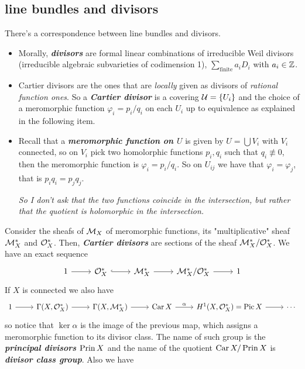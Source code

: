 \subsection{line bundles and divisors}
There's a correspondence between line bundles and divisors.
\begin{defn}\leavevmode
	\begin{itemize}
		\item Morally, \textbf{\textit{divisors}} are formal linear combinations of irreducible Weil divisors (irreducible algebraic subvarieties of codimension 1), $\sum_{\text{finite}}a_iD_i$ with $a_i\in\mathbb{Z}$.
		\item Cartier divisors are the ones that are \textit{locally} given as divisors of \textit{rational function ones}. So a \textbf{\textit{Cartier divisor}} is a covering $\mathcal{U}=\{U_i\}$ and the choice of a meromorphic function $\varphi_i=p_i/q_i$ on each $U_i$ up to equivalence as explained in the following item.
		\item Recall that a \textbf{\textit{meromorphic function on $U$}} is given by $U=\bigcup V_i$ with $V_i$ connected, so on $V_i$ pick two homolorphic functions $p_i,q_i$ such that $q_i\not\equiv0$, then the meromorphic function is $\varphi_i=p_i/q_i$. So on $U_{ij}$ we have that $\varphi_i=\varphi_j$, that is $p_iq_i=p_jq_j$.
	
		\textit{So I don't ask that the two functions coincide in the intersection, but rather that the quotient is holomorphic in the intersection.}
		
	\end{itemize}
\end{defn}
Consider the sheafs of $\mathcal{M}_X$ of meromorphic functions, its "multiplicative" sheaf $\mathcal{M}^*_X$ and $\mathcal{O}^*_X$. Then, \textbf{\textit{Cartier divisors}} are sections of the sheaf $\mathcal{M}_X^*/\mathcal{O}_X^*$. We have an exact sequence
\[\begin{tikzcd}
	1\arrow[r]&\Oc_X^*\arrow[r,hook]&\Mc_X^*\arrow[r]&\Mc_X^*/\Oc_X^*\arrow[r]&1
\end{tikzcd}\]
If $X$ is connected we also have
\[\begin{tikzcd}
	1\arrow[r]&\Gamma(X,\Oc_X^*)\arrow[r]&\Gamma(X,\Mc_X^*)\arrow[r]&\Car X\arrow[r,"\alpha"]&H^1(X,\Oc_X^*)=\Pic X\arrow[r]&\cdots
\end{tikzcd}\]
so notice that $\ker\alpha$ is the image of the previous map, which assigns a meromorphic function to its divisor class. The name of such group is the \textbf{\textit{principal divisors $\operatorname{Prin} X$}} and the name of the quotient $\operatorname{Car} X/\operatorname{Prin} X$ is \textbf{\textit{divisor class group}}. Also we have
